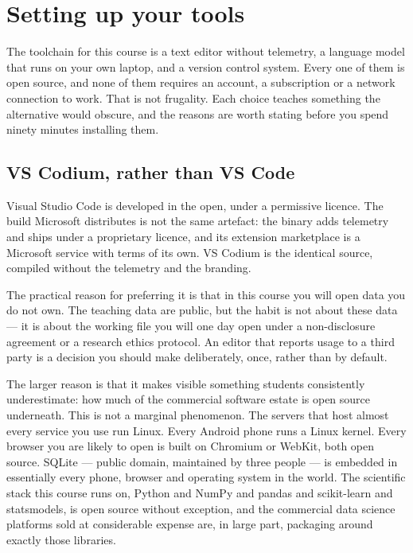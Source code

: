 \documentclass[
  letterpaper,
  10pt,
  twoside,
  openright,
  numbers=noenddot,
  chapterprefix=true]{scrbook}
\begin{document}
\cleardoublepage
{}
{}
\appendix

\chapter{Setting up your tools}\label{setting-up-your-tools}

The toolchain for this course is a text editor without telemetry, a
language model that runs on your own laptop, and a version control
system. Every one of them is open source, and none of them requires an
account, a subscription or a network connection to work. That is not
frugality. Each choice teaches something the alternative would obscure,
and the reasons are worth stating before you spend ninety minutes
installing them.

\section{VS Codium, rather than VS
Code}\label{vs-codium-rather-than-vs-code}

Visual Studio Code is developed in the open, under a permissive licence.
The build Microsoft distributes is not the same artefact: the binary
adds telemetry and ships under a proprietary licence, and its extension
marketplace is a Microsoft service with terms of its own. VS Codium is
the identical source, compiled without the telemetry and the branding.

The practical reason for preferring it is that in this course you will
open data you do not own. The teaching data are public, but the habit is
not about these data --- it is about the working file you will one day
open under a non-disclosure agreement or a research ethics protocol. An
editor that reports usage to a third party is a decision you should make
deliberately, once, rather than by default.

The larger reason is that it makes visible something students
consistently underestimate: how much of the commercial software estate
is open source underneath. This is not a marginal phenomenon. The
servers that host almost every service you use run Linux. Every Android
phone runs a Linux kernel. Every browser you are likely to open is built
on Chromium or WebKit, both open source. SQLite --- public domain,
maintained by three people --- is embedded in essentially every phone,
browser and operating system in the world. The scientific stack this
course runs on, Python and NumPy and pandas and scikit-learn and
statsmodels, is open source without exception, and the commercial data
science platforms sold at considerable expense are, in large part,
packaging around exactly those libraries.
\end{document}
